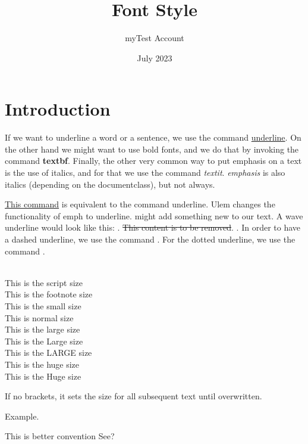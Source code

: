 \documentclass{article}
\title{Font Style}
\author{myTest Account}
\date{July 2023}
\begin{document}
\maketitle

\section{Introduction}

If we want to underline a word or a sentence, we use the command \underline{underline}. On the other hand we might want to use bold fonts, and we do that by invoking the command \textbf{textbf}. Finally, the other very common way to put emphasis on a text is the use of italics, and for that we use the command \textit{textit}. \emph{emphasis} is also italics (depending on the documentclass), but not always.

\uline{This command} is equivalent to the command underline. Ulem changes the functionality of emph to underline.  might add something new to our text. A wave underline would look like this: . \sout{This content is to be removed}. . In order to have a dashed underline, we use the command . For the dotted underline, we use the command .

\clearpage

 \\
{\scriptsize This is the script size} \\
{\footnotesize This is the footnote size} \\
{\small This is the small size} \\
{\normalsize This is normal size} \\
{\large This is the large size} \\
{\Large This is the Large size} \\
{\LARGE This is the LARGE size} \\
{\huge This is the huge size} \\
{\Huge This is the Huge size} 

\normalsize If no brackets, it sets the size for all subsequent text until overwritten.

Example.

{\Huge This is better convention}
See?
\end{document}
